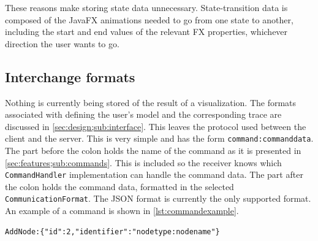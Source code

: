 \par These reasons make storing state data unnecessary. State-transition data is composed of the JavaFX animations needed to go from one state to another, including the start and end values of the relevant FX properties, whichever direction the user wants to go.
\subsection{Interchange formats}\label{sec:design;sub:interchange}
Nothing is currently being stored of the result of a visualization. The formats associated with defining the user's model and the corresponding trace are discussed in \cref{sec:design;sub:interface}. This leaves the protocol used between the client and the server. This is very simple and has the form \texttt{command:commanddata}. The part before the colon holds the name of the command as it is presented in \cref{sec:features;sub:commands}. This is included so the receiver knows which \lstinline{CommandHandler} implementation can handle the command data. The part after the colon holds the command data, formatted in the selected \lstinline{CommunicationFormat}. The JSON format is currently the only supported format. An example of a command is shown in \cref{lst:commandexample}.
\begin{lstlisting}[label={lst:commandexample}, caption={an example command sent from the client to the server in the JSON communication format, indicating that a node as been added to the model}]
AddNode:{"id":2,"identifier":"nodetype:nodename"}
\end{lstlisting}